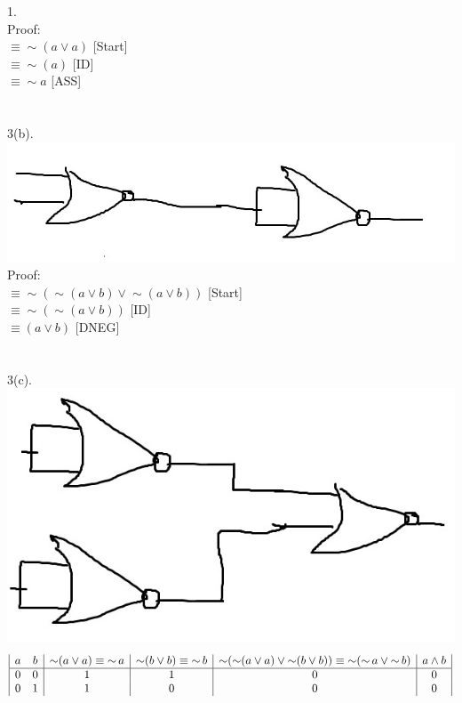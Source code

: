 \documentclass[a4paper, 20pt]{article}
\def\lnot{\mathop{\sim}}
\begin{document}
\begin{question}{1.}
\\Proof:
\\ $ \equiv \lnot (a \lor a)$ [Start]
\\ $ \equiv \lnot (a)$ [ID]
\\ $ \equiv \lnot a$ [ASS]
\\ \boxed{}
\\
\\3(b).
\\
\leavevmode{}\hbox{\includegraphics[scale=0.75]{3b.jpg}}
\\ Proof:
\\ $ \equiv \lnot (\lnot (a \lor b) \lor \lnot (a \lor b))$ [Start]
\\ $ \equiv \lnot (\lnot (a \lor b))$ [ID]
\\ $ \equiv (a \lor b)$ [DNEG]
\\ \boxed{}
\\
\\3(c).
\\
\leavevmode{}\hbox{\includegraphics[scale=0.75]{3c.jpg}}
\begin{displaymath}
\begin{array}{|c c|c|c|c|c|}
a & b & \lnot (a \lor a) \equiv \lnot a & \lnot (b \lor b) \equiv \lnot b & \lnot (\lnot (a \lor a) \lor \lnot (b \lor b)) \equiv \lnot (\lnot a \lor \lnot b) & a \land b\\
\hline 
0 & 0 & 1 & 1 & 0 & 0\\
0 & 1 & 1 & 0 & 0 & 0\\

\end{array}
\end{displaymath}
\end{question}
\end{document}
